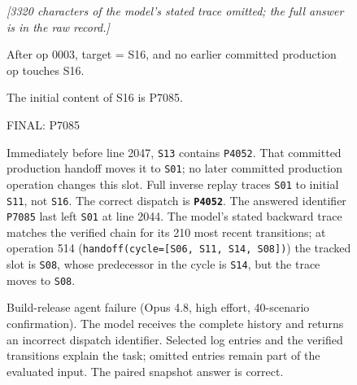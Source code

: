 \begin{figure}[htbp]
\begin{tcolorbox}[enhanced,breakable=false,colback=stalefill,colframe=staleink,boxrule=0.8pt,arc=1mm,fonttitle=\bfseries\small,title={Opus 4.8 answer to the complete history (final lines, verbatim)}]
\small
\emph{[3320 characters of the model's stated trace omitted; the full answer is in the raw record.]}\par
After op 0003, target = S16, and no earlier committed production op touches S16.\par
The initial content of S16 is P7085.\par
FINAL: P7085\par
\end{tcolorbox}
\begin{tcolorbox}[enhanced,breakable=false,colback=currentfill,colframe=currentink,boxrule=0.8pt,arc=1mm,fonttitle=\bfseries\small,title={Verified current state (post-hoc annotation)}]
\small
Immediately before line 2047, \texttt{S13} contains \texttt{P4052}. That committed production handoff moves it to \texttt{S01}; no later committed production operation changes this slot. Full inverse replay traces \texttt{S01} to initial \texttt{S11}, not \texttt{S16}. The correct dispatch is \textbf{\texttt{P4052}}. The answered identifier \texttt{P7085} last left \texttt{S01} at line 2044.
 The model's stated backward trace matches the verified chain for its 210 most recent transitions; at operation 514 (\texttt{handoff(cycle=[S06, S11, S14, S08])}) the tracked slot is \texttt{S08}, whose predecessor in the cycle is \texttt{S14}, but the trace moves to \texttt{S08}.
\end{tcolorbox}
\caption{Build-release agent failure (Opus 4.8, high effort, 40-scenario confirmation). The model receives the complete history and returns an incorrect dispatch identifier. Selected log entries and the verified transitions explain the task; omitted entries remain part of the evaluated input. The paired snapshot answer is correct.}
\label{fig:claude-log-build-agent-0019}
\end{figure}

